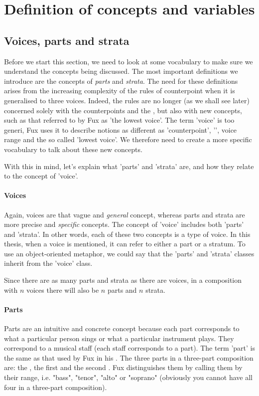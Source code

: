 \chapter{Definition of concepts and variables} \label{chapter:defining-some-concepts-and-redifing-the-variables}
\section{Voices, parts and strata}\label{section:parts-and-strata}
Before we start this section, we need to look at some vocabulary to make sure we understand the concepts being discussed. The most important definitions we introduce are the concepts of \textit{parts} and \textit{strata}. The need for these definitions arises from the increasing complexity of the rules of counterpoint when it is generalised to three voices. Indeed, the rules are no longer (as we shall see later) concerned solely with the counterpoints and the \cf, but also with new concepts, such as that referred to by Fux as 'the lowest voice'. The term 'voice' is too generi, Fux uses it to describe notions as different as 'counterpoint', '\cf', voice range and the so called 'lowest voice'. We therefore need to create a more specific vocabulary to talk about these new concepts.

With this in mind, let's explain what 'parts' and 'strata' are, and how they relate to the concept of 'voice'.

\subsubsection{Voices} Again, voices are that vague and \textit{general} concept, whereas parts and strata are more precise and \textit{specific} concepts. The concept of 'voice' includes both 'parts' and 'strata'. In other words, each of these two concepts is a type of voice. In this thesis, when a voice is mentioned, it can refer to either a part or a stratum. To use an object-oriented metaphor, we could say that the 'parts' and 'strata' classes inherit from the 'voice' class.

Since there are as many parts and strata as there are voices, in a composition with $n$ voices there will also be $n$ parts and $n$ strata.

\subsubsection{Parts}
Parts are an intuitive and concrete concept because each part corresponds to what a particular person sings or what a particular instrument plays. They correspond to a musical staff (each staff corresponds to a part). The term 'part' is the same as that used by Fux in his \gap. The three parts in a three-part composition are: the \cf, the first \cps and the second \cp. Fux distinguishes them by calling them by their range, i.e. "bass", "tenor", "alto" or "soprano" (obviously you cannot have all four in a three-part composition).

